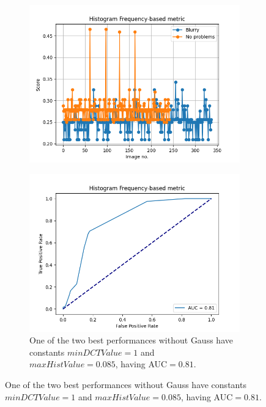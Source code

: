 \begin{figure}[H]
    \centering
    \begin{subfigure}[t]{0.48\textwidth}
        \includegraphics[width=\textwidth]{Figures/tweakHF/min1_max0.085_output_basic_no_gauss.png}
        \caption{}
        \label{fig:HF_basic_85}
    \end{subfigure}\hspace{1em}
    \begin{subfigure}[t]{0.48\textwidth}
        \includegraphics[width=\textwidth]{Figures/tweakHF/min1_max0.085_output_roc_no_gauss.png}
        \caption{One of the two best performances without Gauss have constants $minDCTValue=1$ and $maxHistValue=0.085$, having AUC$=0.81$.}

\end{subfigure}
\end{figure}
